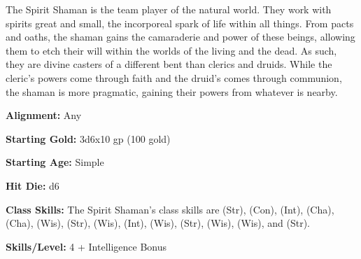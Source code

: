 
The Spirit Shaman is the team player of the natural world. They work with spirits great and small, the incorporeal spark of life within all things. From pacts and oaths, the shaman gains the camaraderie and power of these beings, allowing them to etch their will within the worlds of the living and the dead. As such, they are divine casters of a different bent than clerics and druids. While the cleric's powers come through faith and the druid's comes through communion, the shaman is more pragmatic, gaining their powers from whatever is nearby.

\textbf{Alignment:} Any

\textbf{Starting Gold:} 3d6x10 gp (100 gold)

\textbf{Starting Age:} Simple

\textbf{Hit Die:} d6

\textbf{Class Skills:} The Spirit Shaman's class skills are  (Str),  (Con),  (Int),  (Cha),  (Cha),  (Wis),  (Str),  (Wis),  (Int),  (Wis),  (Str),  (Wis),  (Wis), and  (Str).

\textbf{Skills/Level:} 4 + Intelligence Bonus

\poorbab{}
\poorfor{}
\goodref{}
\goodwil{}

